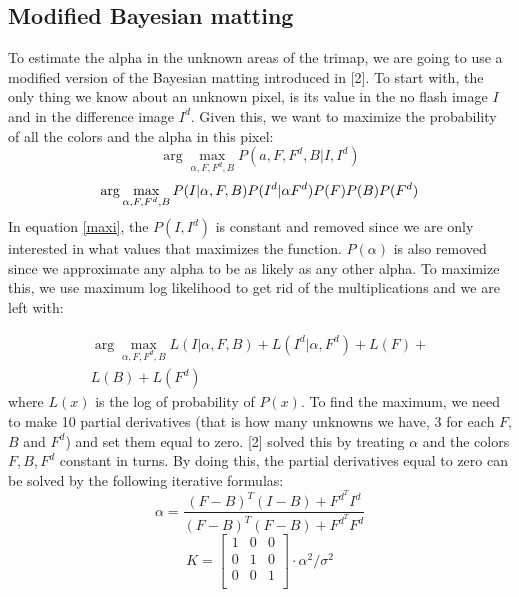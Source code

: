 \documentclass[10pt,letterpaper,twocolumn]{article}
\begin{document}
\subsection{Modified Bayesian matting}
To estimate the alpha in the unknown areas of the trimap, we are going to use a modified version of the Bayesian matting introduced in [2]. To start with, the only thing we know about an unknown pixel, is its value in the no flash image $I$ and in the difference image $I^d$. Given this, we want to maximize the probability of all the colors and the alpha in this pixel:
\begin{equation}
\arg\max_{\alpha, F, F^d, B} P(a,F,F^d,B|I,I^d)
\end{equation}
\begin{equation}
\arg\max_{\alpha, F, F^d, B} P(I|\alpha, F, B)P(I^d|\alpha F^d)P(F)\\P(B)P(F^d)
\label{maxi}
\end{equation}
In equation \ref{maxi}, the $P(I,I^d)$ is constant and removed since we are only interested in what values that maximizes the function. $P(\alpha)$ is also removed since we approximate any alpha to be as likely as any other alpha. To maximize this, we use maximum log likelihood to get rid of the multiplications and we are left with:

\begin{align*}
\arg\max_{\alpha, F, F^d, B}  L(I|\alpha,F,B) + L (I^d|\alpha, F^d) + L(F) +  \\L(B) + L(F^d)
\end{align*}
where $L(x)$ is the log of probability of $P(x)$. To find the maximum, we need to make 10 partial derivatives (that is how many unknowns we have, 3 for each $F$, $B$ and $F^d$) and set them equal to zero. [2] solved this by treating $\alpha$ and the colors $F,B,F^d$ constant in turns. By doing this, the partial derivatives equal to zero can be solved by the following iterative formulas:
\begin{equation}
\alpha = \frac{(F-B)^T(I-B) + F^{d^T}I^d}{(F-B)^T(F-B) + F^{d^T}F^d}
\label{eq:alpha}
\end{equation}
$$ K = 
\begin{bmatrix}
1 & 0 & 0 \\
0 & 1 & 0 \\
0 & 0 & 1 \\
\end{bmatrix} \cdot\alpha^2/\sigma^2
$$
\end{document}
